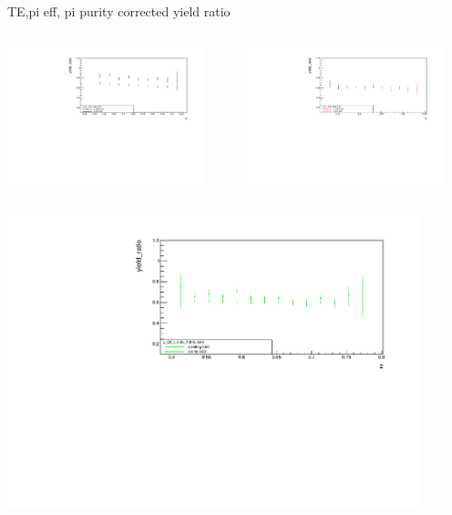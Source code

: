 \begin{frame}{TE,pi eff, pi purity corrected yield ratio}
\begin{columns}
\begin{column}[T]{0.5\textwidth}
\includegraphics[width = 0.9\textwidth]{results/yield/statistics_corr/x_Q2_z_0.35_4.000_0.40_ratio.pdf}
\end{column}
\begin{column}[T]{0.5\textwidth}
\includegraphics[width = 0.9\textwidth]{results/yield/statistics_corr/x_Q2_z_0.35_4.000_0.50_ratio.pdf}
\end{column}
\end{columns}
\begin{columns}
\begin{column}[T]{0.5\textwidth}
\includegraphics[width = 0.9\textwidth]{results/yield/statistics_corr/x_Q2_z_0.35_4.000_0.60_ratio.pdf}

\end{column}
\end{columns}
\end{frame}
